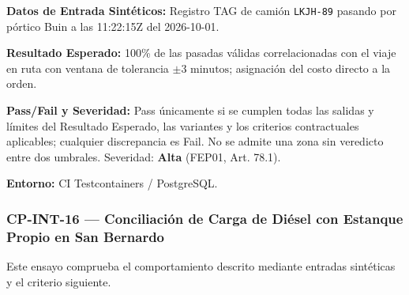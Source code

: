 \par\noindent\textbf{Datos de Entrada Sintéticos:} Registro TAG de camión \texttt{L\allowbreak{}K\allowbreak{}J\allowbreak{}H\allowbreak{}-\allowbreak{}8\allowbreak{}9\allowbreak{}} pasando por pórtico Buin a las 11:22:15Z del 2026-10-01.\par
\par\noindent\textbf{Resultado Esperado:} 100\% de las pasadas válidas correlacionadas con el viaje en ruta con ventana de tolerancia \(\pm 3\text{ minutos}\); asignación del costo directo a la orden.\par
\par\noindent\textbf{Pass/Fail y Severidad:} Pass únicamente si se cumplen todas las salidas y límites del Resultado Esperado, las variantes y los criterios contractuales aplicables; cualquier discrepancia es Fail. No se admite una zona sin veredicto entre dos umbrales. Severidad: \textbf{Alta} (FEP01, Art. 78.1).\par
\par\noindent\textbf{Entorno:} CI Testcontainers / PostgreSQL.\par






\subsubsection*{CP-INT-16 — Conciliación de Carga de Diésel con Estanque Propio en San Bernardo}\label{sec:9-cp-int-16}
Este ensayo comprueba el comportamiento descrito mediante entradas sintéticas y el criterio siguiente.

